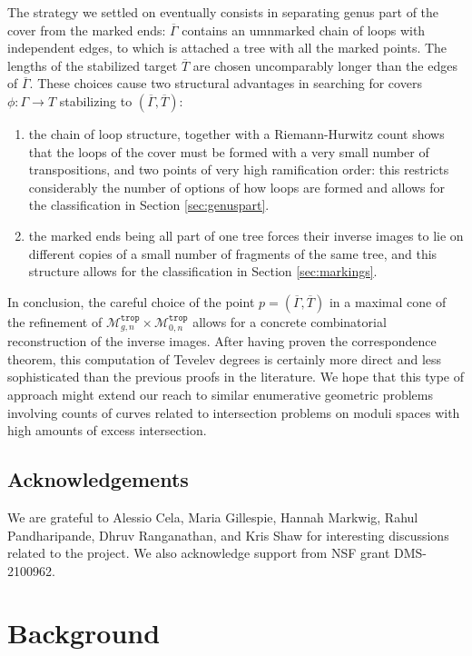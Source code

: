 \documentclass[11pt,reqno]{amsart}
\theoremstyle{definition}
\newcommand\trop{{\mathtt{trop}}}
\newcommand\Mgn[1]{\mathcal M_{#1}}
\begin{document}
The strategy we settled on eventually consists in separating genus part of the cover from the marked ends: $\overline{\Gamma}$ contains an umnmarked chain of loops with independent edges, to which is attached a tree with all the marked points. The lengths of the stabilized target $\overline{T}$ are chosen uncomparably longer than the edges of $\overline{\Gamma}$. These choices cause two structural advantages in searching for covers $\phi:\Gamma \to T$ stabilizing to $(\overline{\Gamma}, \overline{T})$:
\begin{enumerate}
    \item the chain of loop structure, together with a Riemann-Hurwitz count shows that the loops of the cover must be formed with a very small number of  transpositions, and two points of very high ramification order: this restricts considerably the number of options of how loops are formed and allows for the classification in Section \ref{sec:genuspart}.
    \item the marked ends being all part of one tree forces their inverse images to lie on different copies of a small number of fragments of the same tree, and this structure allows for the classification in Section \ref{sec:markings}.
\end{enumerate}
In conclusion, the careful choice of the point $p = (\overline{\Gamma}, \overline{T})$ in a maximal cone of the refinement of $\Mgn{g,n}^\trop\times \Mgn{0,n}^\trop$ allows for a concrete combinatorial reconstruction of the inverse images. After having proven the correspondence theorem, this computation of Tevelev degrees is certainly more direct and less sophisticated than the previous proofs in the literature. We hope that this type of approach might extend our reach to similar enumerative geometric problems involving counts of curves related to intersection problems on moduli spaces with high amounts of excess intersection. 

\subsection{Acknowledgements} We are grateful to Alessio Cela, Maria Gillespie, Hannah Markwig, Rahul Pandharipande, Dhruv Ranganathan, and Kris Shaw for interesting discussions related to the project. We also acknowledge support from NSF grant DMS-2100962.

\section{Background}
\end{document}
